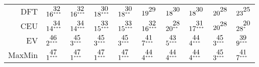 \documentclass[a4paper]{article}\usepackage[]{graphicx}\usepackage[]{color}
\begin{document}
\begin{table}[!htb]
\begin{tabular}{rlllllllll}
  DFT & $16^{\stackrel{\textstyle32\hfill}{\scriptscriptstyle***\hfill}}$ & $16^{\stackrel{\textstyle32\hfill}{\scriptscriptstyle***\hfill}}$ & $18^{\stackrel{\textstyle30\hfill}{\scriptscriptstyle***\hfill}}$ & $18^{\stackrel{\textstyle30\hfill}{\scriptscriptstyle**\hfill}}$ & $19^{\stackrel{\textstyle29\hfill}{\scriptscriptstyle\hfill}}$ & $18^{\stackrel{\textstyle30\hfill}{\scriptscriptstyle\hfill}}$ & $18^{\stackrel{\textstyle30\hfill}{\scriptscriptstyle\hfill}}$ & $20^{\stackrel{\textstyle28\hfill}{\scriptscriptstyle\hfill}}$ & $23^{\stackrel{\textstyle25\hfill}{\scriptscriptstyle\hfill}}$ \\ 
  CEU & $14^{\stackrel{\textstyle34\hfill}{\scriptscriptstyle***\hfill}}$ & $14^{\stackrel{\textstyle34\hfill}{\scriptscriptstyle***\hfill}}$ & $15^{\stackrel{\textstyle33\hfill}{\scriptscriptstyle***\hfill}}$ & $15^{\stackrel{\textstyle33\hfill}{\scriptscriptstyle***\hfill}}$ & $16^{\stackrel{\textstyle32\hfill}{\scriptscriptstyle***\hfill}}$ & $20^{\stackrel{\textstyle28\hfill}{\scriptscriptstyle**\hfill}}$ & $17^{\stackrel{\textstyle31\hfill}{\scriptscriptstyle***\hfill}}$ & $20^{\stackrel{\textstyle28\hfill}{\scriptscriptstyle\hfill}}$ & $28^{\stackrel{\textstyle20\hfill}{\scriptscriptstyle*\hfill}}$ \\ 
  EV & $2^{\stackrel{\textstyle46\hfill}{\scriptscriptstyle***\hfill}}$ & $3^{\stackrel{\textstyle45\hfill}{\scriptscriptstyle***\hfill}}$ & $3^{\stackrel{\textstyle45\hfill}{\scriptscriptstyle***\hfill}}$ & $3^{\stackrel{\textstyle45\hfill}{\scriptscriptstyle***\hfill}}$ & $7^{\stackrel{\textstyle41\hfill}{\scriptscriptstyle***\hfill}}$ & $5^{\stackrel{\textstyle43\hfill}{\scriptscriptstyle***\hfill}}$ & $4^{\stackrel{\textstyle44\hfill}{\scriptscriptstyle***\hfill}}$ & $3^{\stackrel{\textstyle45\hfill}{\scriptscriptstyle***\hfill}}$ & $9^{\stackrel{\textstyle39\hfill}{\scriptscriptstyle***\hfill}}$ \\ 
  MaxMin & $1^{\stackrel{\textstyle47\hfill}{\scriptscriptstyle***\hfill}}$ & $1^{\stackrel{\textstyle47\hfill}{\scriptscriptstyle***\hfill}}$ & $1^{\stackrel{\textstyle47\hfill}{\scriptscriptstyle***\hfill}}$ & $1^{\stackrel{\textstyle47\hfill}{\scriptscriptstyle***\hfill}}$ & $4^{\stackrel{\textstyle44\hfill}{\scriptscriptstyle***\hfill}}$ & $4^{\stackrel{\textstyle44\hfill}{\scriptscriptstyle***\hfill}}$ & $4^{\stackrel{\textstyle44\hfill}{\scriptscriptstyle***\hfill}}$ & $3^{\stackrel{\textstyle45\hfill}{\scriptscriptstyle***\hfill}}$ & $7^{\stackrel{\textstyle41\hfill}{\scriptscriptstyle***\hfill}}$ \\ 

\end{tabular}
\end{table}
\end{document}
